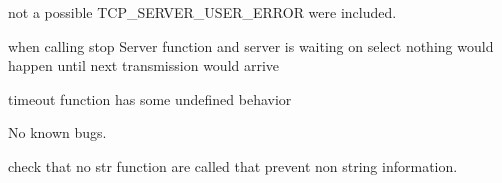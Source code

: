 
\begin{DoxyRefList}
\item[\label{bug__bug000001}%
\hypertarget{bug__bug000001}{}%
Global \hyperlink{tcp_8h_ad8d50de6be25343050ccc2acab04af0c}{M\+A\+X\+\_\+\+C\+L\+I\+E\+N\+T\+S\+\_\+\+N\+UM} ]not a possible T\+C\+P\+\_\+\+S\+E\+R\+V\+E\+R\+\_\+\+U\+S\+E\+R\+\_\+\+E\+R\+R\+OR were included. 

when calling stop Server function and server is waiting on select nothing would happen until next transmission would arrive 

timeout function has some undefined behavior  
\item[\label{bug__bug000003}%
\hypertarget{bug__bug000003}{}%
File \hyperlink{tlv_8h}{tlv.h} ]No known bugs. 

check that no str function are called that prevent non string information.  
\item[\label{bug__bug000002}%
\hypertarget{bug__bug000002}{}%
Global \hyperlink{tcp__client_8h_a91ad9478d81a7aaf2593e8d9c3d06a14}{uint} ]
\end{DoxyRefList}
